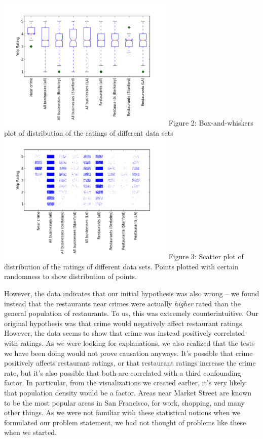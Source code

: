 \documentclass{article}
\begin{document}
\begin{center}
  \includegraphics[keepaspectratio=true, width=320px]{boxplot.png}
  Figure 2: Box-and-whiskers plot of distribution of the ratings of
  different data sets \\[20pt]

  \includegraphics[keepaspectratio=true, width=320px]{scatter_plot.png}
  Figure 3: Scatter plot of distribution of the ratings of different data
  sets. Points plotted with certain randomness to show distribution of
  points. \\[20pt]
\end{center}

However, the data indicates that our initial hypothesis was also wrong --
we found instead that the restaurants near crimes were actually
\textit{higher} rated than the general population of restaurants. To us,
this was extremely counterintuitive. Our original hypothesis was that crime
would negatively affect restaurant ratings. However, the data seems to show
that crime was instead positively correlated with ratings. As we were
looking for explanations, we also realized that the tests we have been
doing would not prove causation anyways. It's possible that crime
positively affects restaurant ratings, or that restaurant ratings increase
the crime rate, but it's also possible that both are correlated with a
third confounding factor. In particular, from the visualizations we created
earlier, it's very likely that population density would be a factor. Areas
near Market Street are known to be the most popular areas in San Francisco,
for work, shopping, and many other things. As we were not familiar with
these statistical notions when we formulated our problem statement, we had
not thought of problems like these when we started.
\end{document}
